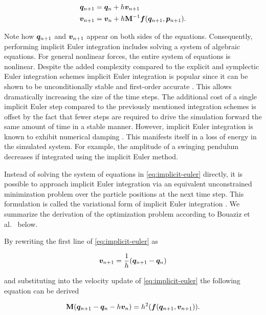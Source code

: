 \begin{align}
    \begin{split}\label{eq:implicit-euler}
        \bm{q}_{n+1} &= \bm{q}_n + h\bm{v}_{n+1}\\
        \bm{v}_{n+1} &= \bm{v}_n + h\mathbf{M}^{-1}\bm{f}(\bm{q}_{n+1}, \bm{p}_{n+1}).
    \end{split}
\end{align}

\noindent Note how $\bm{q}_{n+1}$ and $\bm{v}_{n+1}$ appear on both sides of the equations. Consequently, performing implicit 
Euler integration includes solving a system of algebraic equations. For general nonlinear forces, the entire system of equations is nonlinear.
Despite the added complexity compared to the explicit and
symplectic Euler integration schemes implicit Euler integration is popular since it can be shown to be unconditionally stable and first-order
accurate \cite{chapra2005}. This allows dramatically increasing the size of the time steps. The additional cost of a single implicit Euler 
step compared to the previously mentioned integration schemes is offset by the fact that fewer steps are required to drive the 
simulation forward the same amount of time in a stable manner. However, implicit Euler integration is known to exhibit numerical 
damping \cite{stern2006}. This manifests itself in a loss of energy in the simulated system. For example, the amplitude of a swinging 
pendulum decreases if integrated using the implicit Euler method.

Instead of solving the system of equations in \autoref{eq:implicit-euler} directly, it is possible to approach implicit
Euler integration via an equivalent unconstrained minimization problem over the particle positions at the next time step. This formulation
is called the variational form of implicit Euler integration \cite{bouaziz2014}. We summarize the derivation of the optimization problem
according to Bouaziz et al.\ \cite{bouaziz2014} below.

By rewriting the first line of \autoref{eq:implicit-euler} as

\[
    \bm{v}_{n+1} = \frac{1}{h}(\bm{q}_{n+1} - \bm{q}_n)
\]

\noindent and substituting into the velocity update of \autoref{eq:implicit-euler} the following equation can be derived

\begin{equation}\label{eq:implicit-positional}
    \mathbf{M}(\bm{q}_{n+1} - \bm{q}_n - h\bm{v}_n) = h^2(\bm{f}(\bm{q}_{n+1}, \bm{v}_{n+1})).
\end{equation}

